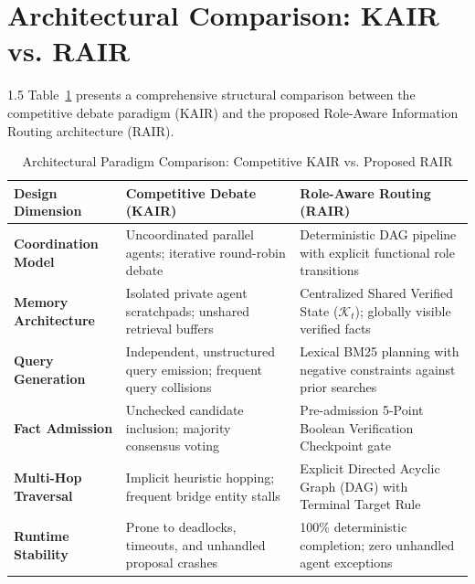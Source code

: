 \documentclass[12pt,a4paper]{report}
\begin{document}
\section{Architectural Comparison: KAIR vs. RAIR}
\begin{spacing}{1.5}
Table~\ref{tab:paradigm_comparison} presents a comprehensive structural comparison between the competitive debate paradigm (KAIR) and the proposed Role-Aware Information Routing architecture (RAIR).

\begin{table}[!htbp]
\centering
\small
\begin{tabular}{|p{3.5cm}|p{5.5cm}|p{5.5cm}|}
\hline
\textbf{Design Dimension} & \textbf{Competitive Debate (KAIR)} & \textbf{Role-Aware Routing (RAIR)} \\
\hline
\textbf{Coordination Model} & Uncoordinated parallel agents; iterative round-robin debate & Deterministic DAG pipeline with explicit functional role transitions \\
\hline
\textbf{Memory Architecture} & Isolated private agent scratchpads; unshared retrieval buffers & Centralized Shared Verified State ($\mathcal{K}_t$); globally visible verified facts \\
\hline
\textbf{Query Generation} & Independent, unstructured query emission; frequent query collisions & Lexical BM25 planning with negative constraints against prior searches \\
\hline
\textbf{Fact Admission} & Unchecked candidate inclusion; majority consensus voting & Pre-admission 5-Point Boolean Verification Checkpoint gate \\
\hline
\textbf{Multi-Hop Traversal} & Implicit heuristic hopping; frequent bridge entity stalls & Explicit Directed Acyclic Graph (DAG) with Terminal Target Rule \\
\hline
\textbf{Runtime Stability} & Prone to deadlocks, timeouts, and unhandled proposal crashes & 100\% deterministic completion; zero unhandled agent exceptions \\
\hline
\end{tabular}
\caption{Architectural Paradigm Comparison: Competitive KAIR vs. Proposed RAIR}
\label{tab:paradigm_comparison}
\end{table}
\end{spacing}
\end{document}
